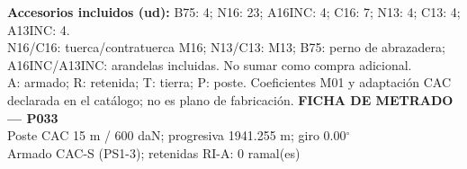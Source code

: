 \begingroup\scriptsize
\textbf{Accesorios incluidos (ud):} B75: 4; N16: 23; A16INC: 4; C16: 7; N13: 4; C13: 4; A13INC: 4.\\
N16/C16: tuerca/contratuerca M16; N13/C13: M13; B75: perno de abrazadera; A16INC/A13INC: arandelas incluidas. No sumar como compra adicional.\\
A: armado; R: retenida; T: tierra; P: poste. Coeficientes M01 y adaptación CAC declarada en el catálogo; no es plano de fabricación.
\endgroup\endgroup
\clearpage{}
\begingroup\small\setlength{\parskip}{3pt}\renewcommand{\arraystretch}{1.05}
\textbf{\large FICHA DE METRADO — P033}\\[4pt]
Poste CAC 15 m / 600 daN; progresiva 1941.255 m; giro 0.00\ensuremath{^\circ}\\
Armado CAC-S (PS1-3); retenidas RI-A: 0 ramal(es)\\
\begingroup\scriptsize
